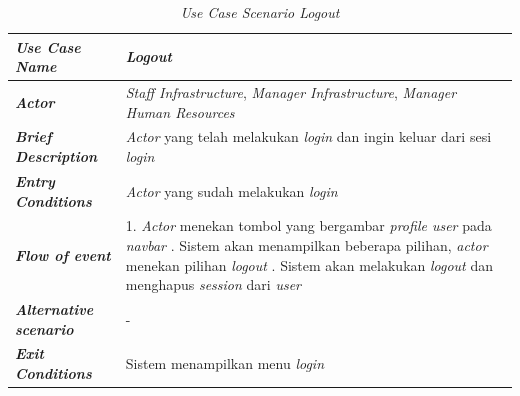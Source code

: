 \FloatBarrier
\begin{longtable}{ |p{6cm}|p{8cm}|}
\caption{\textit{Use Case Scenario Logout}}\label{tab:use-case-scenario-logout} 
\\
\hline
\textbf{\textit{Use Case Name}}
&\textit{Logout}
\\ \hline

\textbf{\textit{Actor}}
&\textit{Staff Infrastructure}, \textit{Manager Infrastructure}, \textit{Manager Human Resources} 
\\ \hline

\textbf{\textit{Brief Description}}
&\textit{Actor} yang telah melakukan \textit{login} dan ingin keluar dari sesi \textit{login}
\\ \hline

\textbf{\textit{Entry Conditions}}
&\textit{Actor} yang sudah melakukan \textit{login}
\\ \hline

\textbf{\textit{Flow of event}}
&1. \textit{Actor} menekan tombol yang bergambar \textit{profile user} pada \textit{navbar}
\newline
2. Sistem akan menampilkan beberapa pilihan, \textit{actor} menekan pilihan \textit{logout}
\newline
3. Sistem akan melakukan \textit{logout} dan menghapus \textit{session} dari \textit{user}
\\ \hline

\textbf{\textit{Alternative scenario}}
&-
\\ \hline

\textbf{\textit{Exit Conditions}}
&Sistem menampilkan menu \textit{login}
\\ \hline
\end{longtable}

